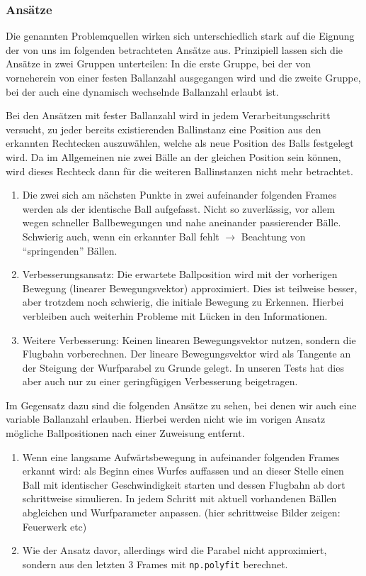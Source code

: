 \documentclass[12pt,a4paper,ngerman]{scrartcl}
\begin{document}
\subsubsection{Ansätze}

Die genannten Problemquellen wirken sich unterschiedlich stark auf die Eignung der von
uns im folgenden betrachteten Ansätze aus. Prinzipiell lassen sich die Ansätze
in zwei Gruppen unterteilen: In die erste Gruppe, bei der von vorneherein von einer
festen Ballanzahl ausgegangen wird und die zweite Gruppe, bei der auch eine dynamisch wechselnde Ballanzahl erlaubt ist.

Bei den Ansätzen mit fester Ballanzahl wird in jedem Verarbeitungsschritt versucht,
zu jeder bereits existierenden Ballinstanz eine Position aus den erkannten Rechtecken
auszuwählen, welche als neue Position des Balls festgelegt wird. Da im Allgemeinen nie
zwei Bälle an der gleichen Position sein können, wird dieses Rechteck dann für die weiteren Ballinstanzen nicht mehr betrachtet.

 \begin{enumerate}
 \item Die zwei sich am nächsten Punkte in zwei aufeinander folgenden Frames werden als der identische Ball aufgefasst. Nicht so zuverlässig, vor allem wegen schneller Ballbewegungen und nahe aneinander passierender Bälle. Schwierig auch, wenn ein erkannter Ball fehlt $\rightarrow$ Beachtung von ``springenden'' Bällen.
 \item Verbesserungsansatz: Die erwartete Ballposition wird mit der vorherigen Bewegung (linearer Bewegungsvektor) approximiert. Dies ist teilweise besser, aber trotzdem noch schwierig, die initiale Bewegung zu Erkennen. Hierbei verbleiben auch weiterhin Probleme mit Lücken in den Informationen.
 \item Weitere Verbesserung: Keinen linearen Bewegungsvektor nutzen, sondern die Flugbahn vorberechnen. Der lineare Bewegungsvektor wird als Tangente an der Steigung der Wurfparabel zu Grunde gelegt. In unseren Tests hat dies aber auch nur zu einer geringfügigen Verbesserung beigetragen.
 \end{enumerate}

Im Gegensatz dazu sind die folgenden Ansätze zu sehen, bei denen wir auch eine variable Ballanzahl erlauben. Hierbei werden nicht wie im vorigen Ansatz mögliche Ballpositionen nach einer Zuweisung entfernt.

\begin{enumerate}
	\item Wenn eine langsame Aufwärtsbewegung in aufeinander folgenden Frames erkannt wird: als Beginn eines Wurfes auffassen und an dieser Stelle einen Ball mit identischer Geschwindigkeit starten und dessen Flugbahn ab dort schrittweise simulieren. In jedem Schritt mit aktuell vorhandenen Bällen abgleichen und Wurfparameter anpassen. (hier schrittweise Bilder zeigen: Feuerwerk etc)
	\item Wie der Ansatz davor, allerdings wird die Parabel nicht approximiert, sondern	aus den letzten 3 Frames mit \lstinline{np.polyfit} berechnet.
\end{enumerate}
\end{document}
